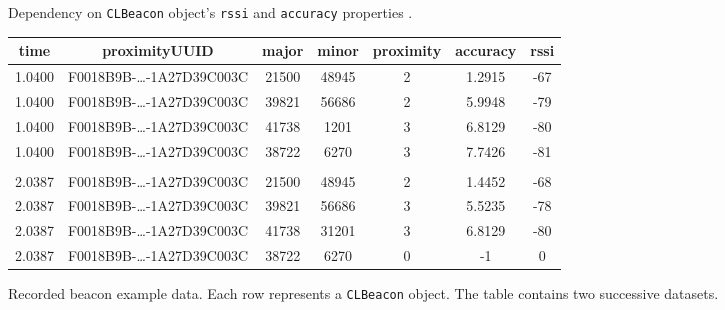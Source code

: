 \begin{figure}
\caption{Dependency on \texttt{CLBeacon} object's \texttt{rssi} and \texttt{accuracy} properties \cite{apple:ios_doc_cl, wang:bt_pos, kotanen:exp_local_pos_bt}.}
\label{fig:eval_accuracy_vs_distance}
\end{figure}



\begin{figure}
\begin{tabular}{*{7}{c}}
time & proximityUUID & major & minor & proximity & accuracy & rssi \\
\hline
1.0400 & F0018B9B-\dots-1A27D39C003C & 21500 & 48945 & 2 & 1.2915 & -67\\
1.0400 & F0018B9B-\dots-1A27D39C003C & 39821 & 56686 & 2 & 5.9948 & -79\\
1.0400 & F0018B9B-\dots-1A27D39C003C & 41738 & 1201 & 3 & 6.8129 & -80\\
1.0400 & F0018B9B-\dots-1A27D39C003C & 38722 & 6270 & 3 & 7.7426 & -81\\
 & & & & & & \\
2.0387 & F0018B9B-\dots-1A27D39C003C & 21500 & 48945 & 2 & 1.4452 & -68\\
2.0387 & F0018B9B-\dots-1A27D39C003C & 39821 & 56686 & 3 & 5.5235 & -78\\
2.0387 & F0018B9B-\dots-1A27D39C003C & 41738 & 31201 & 3 & 6.8129 & -80\\
2.0387 & F0018B9B-\dots-1A27D39C003C & 38722 & 6270 & 0 & -1 & 0\\
\end{tabular}
\caption{Recorded beacon example data. Each row represents a \texttt{CLBeacon} object. The table contains two successive datasets.}
\label{fig:beaconExampleData}
\end{figure}


